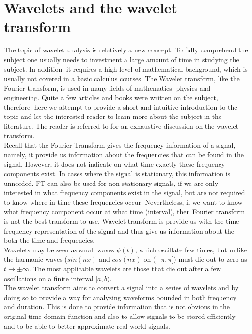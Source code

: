 \documentclass[12pt,english]{report}
\begin{document}
\chapter{Wavelets and the wavelet transform}

The topic of wavelet analysis is relatively a new concept. To fully comprehend the subject one usually needs to investment a large amount of time in studying the subject. In addition, it requires a high level of mathematical background, which is usually not covered in a basic calculus courses.
The Wavelet transform, like the Fourier transform, is used in many fields of mathematics, physics and engineering. Quite a few articles and books were written on the subject, therefore, here we attempt to provide a short and intuitive introduction to the topic and let the interested reader to learn more about the subject in the literature. The reader is referred to \cite{meyer1992wavelets} for an exhaustive discussion on the wavelet transform.\\ 

Recall that the Fourier Transform gives the frequency information of a signal, namely, it provide us information about the frequencies that can be found in the signal. However, it does not indicate on what time exactly these frequency components exist. In cases where the signal is stationary, this information is unneeded. FT can also be used for non-stationary signals, if we are only interested in what frequency components exist in the signal, but are not required to know where in time these frequencies occur. Nevertheless, if we want to know what frequency component occur at what time (interval), then Fourier transform is not the best transform to use. Wavelet transform is provide us with the time-frequency representation of the signal and thus give us information about the both the time and frequencies.\\

Wavelets may be seen as small waves $\psi(t)$, which oscillate few times, but unlike the harmonic waves ($sin(nx)$ and $cos(nx)$ on $(-\pi,\pi]$) must die out to zero as $t \rightarrow \pm\infty$. The most applicable wavelets are those that die out after a few oscillations on a finite interval $[a,b)$. \\

The wavelet transform aims to convert a signal into a series of wavelets and by doing so to provide a way for analyzing waveforms bounded in both frequency and duration. This is done to provide information that is not obvious in the original time domain function and also to allow signals to be stored efficiently and to be able to better approximate real-world signals. \\
\end{document}
